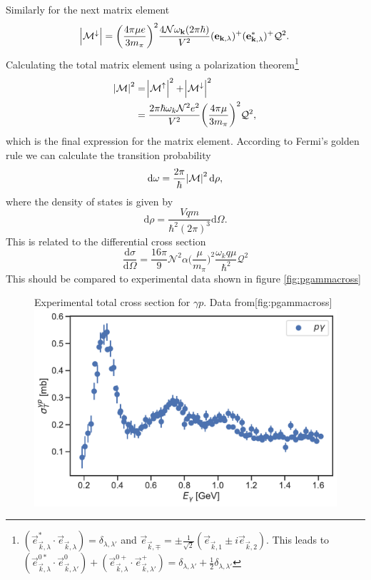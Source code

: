Similarly for the next matrix element
\begin{equation}
    \abs{\mathcal{M}^\downarrow} = \bigg( \frac{4\pi \mu e}{3 m_\pi}\bigg)^2 \frac{4\mathcal{N}\omega_{\bm{\mathrm{k}}}(2\pi\hbar)}{V^2}(\bm{\mathrm{e}}_{\bm{\mathrm{k}},\lambda})^+(\bm{\mathrm{e}}_{\bm{\mathrm{k}},\lambda}^*)^+ \mathcal{Q}^2.
\end{equation}
Calculating the total matrix element using a polarization theorem\footnote{$(\vec{e}_{\vec{k},\lambda}^*\cdot \vec{e}_{\vec{k},\lambda})=\delta_{\lambda,\lambda'}$ and $\vec{e}_{\vec{k},\mp}=\pm\frac{1}{\sqrt{2}}(\vec{e}_{\vec{k},1}\pm i\vec{e}_{\vec{k},2})$. This leads to $(\vec{e}^{0*}_{\vec{k},\lambda}\cdot\vec{e}^{0}_{\vec{k},\lambda'})+(\vec{e}^{0+}_{\vec{k},\lambda}\cdot\vec{e}^{+}_{\vec{k},\lambda'})=\delta_{\lambda,\lambda'}+\frac{1}{2}\delta_{\lambda,\lambda'}$}
\begin{align}
    \abs{\mathcal{M}}^2 &= \abs{\mathcal{M}^\uparrow}^2 + \abs{\mathcal{M}^\downarrow}^2 \\
    &= \frac{2\pi \hbar \omega_k \mathcal{N}^2 e^2}{V^2} \bigg( \frac{4\pi\mu}{3m_\pi}\bigg)^2 \mathcal{Q}^2,
\end{align}
which is the final expression for the matrix element. According to Fermi's golden rule we can calculate the transition probability
\begin{equation}\label{domega}
    \text{d}\omega = \frac{2\pi}{\hbar} \abs{\mathcal{M}}^2 \text{d}\rho,
\end{equation}
where the density of states is given by
\begin{equation}\label{densityofstates}
    \text{d}\rho = \frac{Vqm }{\hbar^2 (2\pi)^3}\text{d}\Omega.
\end{equation}
This is related to the differential cross section 
\begin{equation}\label{diffcrosssection}
    \frac{\text{d}\sigma}{\text{d}\Omega}=\frac{16 \pi}{9} \mathcal{N}^2 \alpha \bigg(\frac{\mu}{m_\pi} \bigg)^2 \frac{\omega_k q\mu}{\hbar^2}\mathcal{Q}^2
\end{equation}
This should be compared to experimental data shown in figure \ref{fig:pgammacross}
\begin{figure}[H]
    \begin{sidecaption}{Experimental total cross section for $\gamma p$. Data from}[fig:pgammacross]
    \includegraphics[width=\linewidth]{Figures/pgammaexperiment.pdf}
    \end{sidecaption}
\end{figure}
